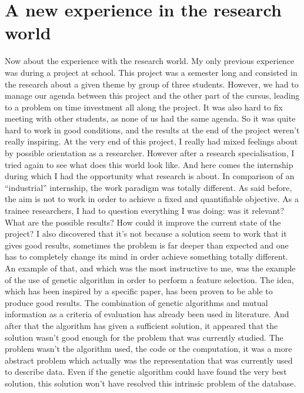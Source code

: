 \documentclass{report}
\begin{document}
	\section{A new experience in the research world}
	
	Now about the experience with the research world. My only previous experience was during a project at school. This project was a semester long and consisted in the research about a given theme by group of three students. However, we had to manage our agenda between this project and the other part of the cursus, leading to a problem on time investment all along the project. It was also hard to fix meeting with other students, as none of us had the same agenda. So it was quite hard to work in good conditions, and the results at the end of the project weren't really inspiring. At the very end of this project, I really had mixed feelings about by possible orientation as a researcher. However after a research specialisation, I tried again to see what does this world look like. And here comes the internship during which I had the opportunity what research is about. In comparison of an “industrial” internship, the work paradigm was totally different. As said before, the aim is not to work in order to achieve a fixed and quantifiable objective. As a trainee researchers, I had to question everything I was doing: was it relevant? What are the possible results? How could it improve the current state of the project? I also discovered that it's not because a solution seem to work that it gives good results, sometimes the problem is far deeper than expected and one has to completely change its mind in order achieve something totally different.
	An example of that, and which was the most instructive to me, was the example of the use of genetic algorithm in order to perform a feature selection. The idea, which has been inspired by a specific paper, has been proven to be able to produce good results. The combination of genetic algorithms and mutual information as a criteria of evaluation has already been used in literature. And after that the algorithm has given a sufficient solution, it appeared that the solution wasn't good enough for the problem that was currently studied. The problem wasn't the algorithm used, the code or the computation, it was a more abstract problem which actually was the representation that was currently used to describe data. Even if the genetic algorithm could have found the very best solution, this solution won't have resolved this intrinsic problem of the database.\\
	
\end{document}
